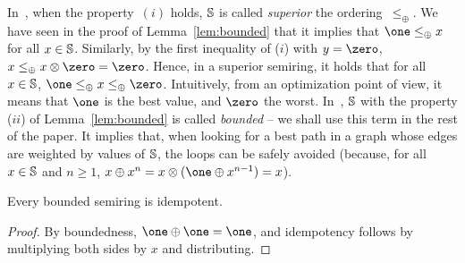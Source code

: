In~\cite{Huang08advanceddynamic}, when the property~$(i)$ holds,  
$\mathbb{S}$ is called \emph{superior} \wrt the ordering~$\leq_\oplus$.
We have seen in the proof of Lemma~\ref{lem:bounded} that it implies that 
$\one \leq_\oplus x$ for all $x \in \mathbb{S}$.
Similarly, by the first inequality of ($i$) with $y = \zero$,  
$x \leq_\oplus x \otimes \zero = \zero$.
%
Hence, in a superior semiring, %
it holds that %
for all $x \in \mathbb{S}$, $\one \leq_\oplus x \leq_\oplus \zero$.
%
Intuitively, from an optimization point of view,
it means that $\one$ is the best value, and $\zero$ the worst.
%
In~\cite{Mohri02semiring}, 
$\mathbb{S}$ with the property ($ii$) of Lemma~\ref{lem:bounded}  
is called \emph{bounded} -- we shall use this term in the rest of the paper. 
It implies that, when looking for a best path in a graph whose edges
are weighted by values of $\mathbb{S}$, the loops can be safely avoided
(because, for all $x \in \mathbb{S}$ and $n \geq 1$, 
 $x \oplus x^n = x \otimes (\one \oplus x^{n-1}) = x$).


\begin{lemma}
Every bounded semiring is idempotent.
\end{lemma}
\begin{proof}
By boundedness, $\one \oplus \one = \one$, 
and idempotency follows by multiplying
both sides by $x$ and distributing. 
\end{proof}

